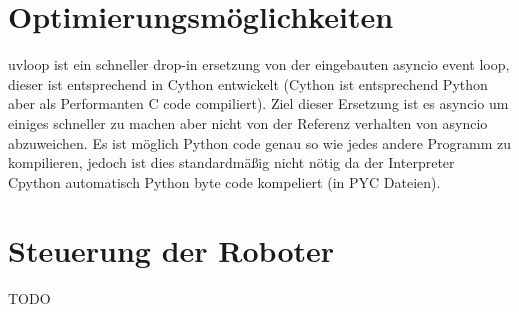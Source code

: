 \section{Optimierungsmöglichkeiten}
\label{subsec:Optimierungsmöglichkeiten}
uvloop ist ein schneller drop-in ersetzung von der eingebauten asyncio event loop, 
dieser ist entsprechend in Cython entwickelt (Cython ist entsprechend Python aber als Performanten C code compiliert).
Ziel dieser Ersetzung ist es asyncio um einiges schneller zu machen aber nicht von der Referenz verhalten von asyncio abzuweichen. 
Es ist möglich Python code genau so wie jedes andere Programm zu kompilieren,
jedoch ist dies standardmäßig nicht nötig da der Interpreter Cpython automatisch Python byte code kompeliert (in PYC Dateien).

\section{Steuerung der Roboter}
\label{subsec:backend_robot_detection}
TODO 
